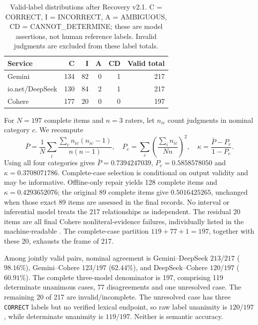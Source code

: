 \begin{table}[htbp]\centering\small
\caption{Valid-label distributions after Recovery v2.1. C = CORRECT, I = INCORRECT, A = AMBIGUOUS, CD = CANNOT\_DETERMINE; these are model assertions, not human reference labels. Invalid judgments are excluded from these label totals.}\label{tab:relationship-labels}
\begin{tabular}{@{}lrrrrr@{}}\toprule
Service & C & I & A & CD & Valid total\\\midrule
Gemini & 134 & 82 & 0 & 1 & 217\\
io.net/DeepSeek & 130 & 84 & 2 & 1 & 217\\
Cohere & 177 & 20 & 0 & 0 & 197\\\bottomrule
\end{tabular}\end{table}

For $N=197$ complete items and $n=3$ raters, let $n_{ic}$ count judgments in nominal category $c$. We recompute
\begin{equation}
\bar P=\frac{1}{N}\sum_i\frac{\sum_c n_{ic}(n_{ic}-1)}{n(n-1)},\quad
P_e=\sum_c\left(\frac{\sum_i n_{ic}}{Nn}\right)^2,\quad
\kappa=\frac{\bar P-P_e}{1-P_e}.
\end{equation}
Using all four categories gives $\bar P=0.7394247039$, $P_e=0.5858578050$ and $\kappa=0.3708071786$. Complete-case selection is conditional on output validity and may be informative. Offline-only repair yields 128 complete items and $\kappa=0.4293652076$; the original 89 complete items give $0.5016425265$, unchanged when those exact 89 items are assessed in the final records. No interval or inferential model treats the 217 relationships as independent. The residual 20 items are all final Cohere nonliteral-evidence failures, individually listed in the machine-readable . The complete-case partition $119+77+1=197$, together with these 20, exhausts the frame of 217.

Among jointly valid pairs, nominal agreement is Gemini--DeepSeek $213/217$ ($98.16\%$), Gemini--Cohere $123/197$ ($62.44\%$), and DeepSeek--Cohere $120/197$ ($60.91\%$). The complete three-model denominator is 197, comprising 119 determinate unanimous cases, 77 disagreements and one unresolved case. The remaining 20 of 217 are invalid/incomplete. The unresolved case has three \texttt{CORRECT} labels but no verified lexical endpoint, so raw label unanimity is $120/197$, while determinate unanimity is $119/197$. Neither is semantic accuracy.

